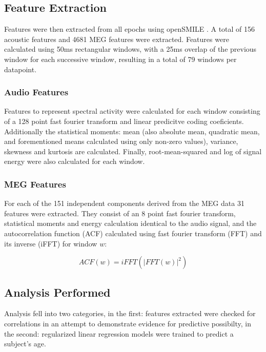 \documentclass[a4paper]{article}
\begin{document}
\subsection{Feature Extraction}

Features were then extracted from all epochs using openSMILE \cite{Eyben13-RDI}. A total of 156 acoustic features and 4681 MEG features were extracted. Features were calculated using 50ms rectangular windows, with a 25ms overlap of the previous window for each successive window, resulting in a total of 79 windows per datapoint.

\subsubsection{Audio Features}

Features to represent spectral activity were calculated for each window consisting of a 128 point fast fourier transform and linear predicitve coding coeficients. Additionally the statistical moments: mean (also absolute mean, quadratic mean, and forementioned means calculated using only non-zero values), variance, skewness and kurtosis are calculated. Finally, root-mean-squared and log of signal energy were also calculated for each window.

\subsubsection{MEG Features}

For each of the 151 independent components derived from the MEG data 31 features were extracted. They consist of an 8 point fast fourier transform, statistical moments and energy calculation identical to the audio signal, and the autocorrelation function (ACF) calculated using fast fourier transform (FFT) and its inverse (iFFT) for window $w$:

\begin{equation}
  ACF(w) = iFFT(|FFT(w)|^2)
  \label{eq1}
\end{equation}

\subsection{Analysis Performed}

Analysis fell into two categories, in the first: features extracted were checked for correlations in an attempt to demonstrate evidence for predictive possibilty, in the second: regularized linear regression models were trained to predict a subject's age.
\end{document}
